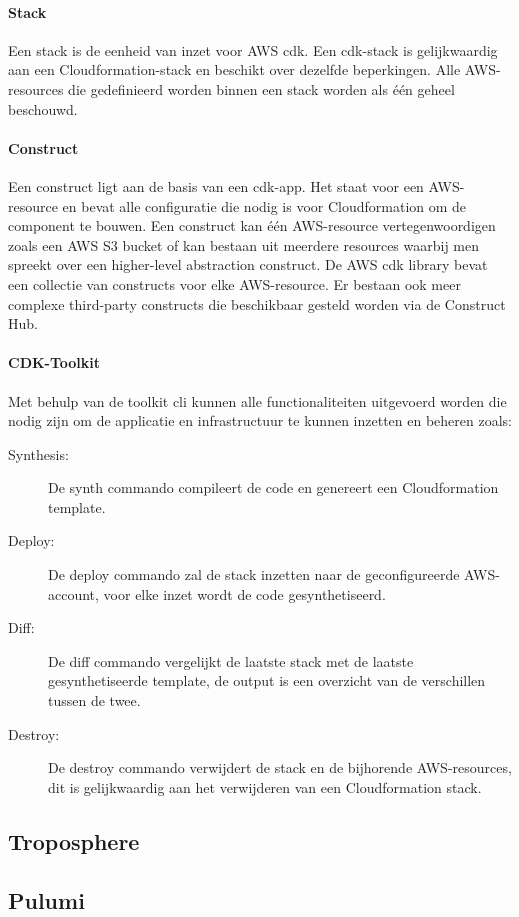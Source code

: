 \paragraph{Stack}

Een stack is de eenheid van inzet voor AWS \acrshort{cdk}.
Een \acrshort{cdk}-stack is gelijkwaardig aan een Cloudformation-stack en beschikt over dezelfde beperkingen.
Alle AWS-resources die gedefinieerd worden binnen een stack worden als één geheel beschouwd.

\paragraph{Construct}

Een construct ligt aan de basis van een \acrshort{cdk}-app.
Het staat voor een AWS-resource en bevat alle configuratie die nodig is voor Cloudformation om de component te bouwen.
Een construct kan één AWS-resource vertegenwoordigen zoals een AWS S3 bucket of kan bestaan uit meerdere resources waarbij men spreekt over een higher-level abstraction construct.
De AWS \acrshort{cdk} library bevat een collectie van constructs voor elke AWS-resource.
Er bestaan ook meer complexe third-party constructs die beschikbaar gesteld worden via de Construct Hub.

\paragraph{CDK-Toolkit}

Met behulp van de toolkit \acrshort{cli} kunnen alle functionaliteiten uitgevoerd worden die nodig zijn om de applicatie en infrastructuur te kunnen inzetten en beheren zoals:

\begin{description}
    \item[Synthesis:] De synth commando compileert de code en genereert een Cloudformation template.
    \item[Deploy:] De deploy commando zal de stack inzetten naar de geconfigureerde AWS-account, voor elke inzet wordt de code gesynthetiseerd.
    \item[Diff:] De diff commando vergelijkt de laatste stack met de laatste gesynthetiseerde template, de output is een overzicht van de verschillen tussen de twee.
    \item[Destroy:] De destroy commando verwijdert de stack en de bijhorende AWS-resources, dit is gelijkwaardig aan het verwijderen van een Cloudformation stack.
\end{description}

\subsection{Troposphere}
\label{sec:service-troposphere}


\subsection{Pulumi}
\label{sec:service-pulumi}


